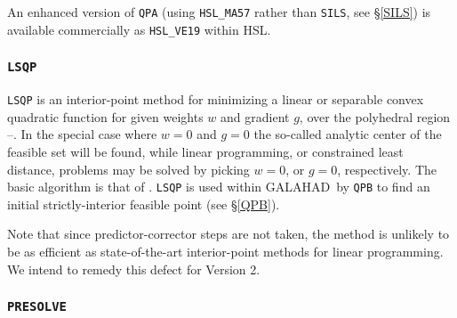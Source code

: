 \documentclass[twoside]{article}
\newcommand{\gal}{{\sf GALAHAD}}
\newcommand{\ltsubsubsection}[1]{\subsubsection{{\tt #1}} \label{#1}}
\begin{document}
An enhanced version of {\tt QPA} (using {\tt HSL\_MA57} rather than {\tt SILS},
see \S\ref{SILS}) is available commercially as {\tt HSL\_VE19} within HSL.

\ltsubsubsection{LSQP}

{\tt LSQP} is an interior-point method for minimizing a linear or
separable convex quadratic function
for given weights $w$ and gradient $g$,
over the polyhedral region --.
In the special case where $w = 0$ and $g = 0$
the so-called analytic center of the feasible set will be found,
while linear programming, or constrained least distance, problems
may be solved by picking $w = 0$, or $g = 0$, respectively.
The basic algorithm is that of .
{\tt LSQP} is used within \gal\ by {\tt QPB} to find an initial
strictly-interior feasible point (see \S\ref{QPB}).

Note that since predictor-corrector steps are not taken, the method
is unlikely to be as efficient as state-of-the-art interior-point
methods for linear programming. We intend to remedy this defect for
Version 2.

\ltsubsubsection{PRESOLVE}
\end{document}
